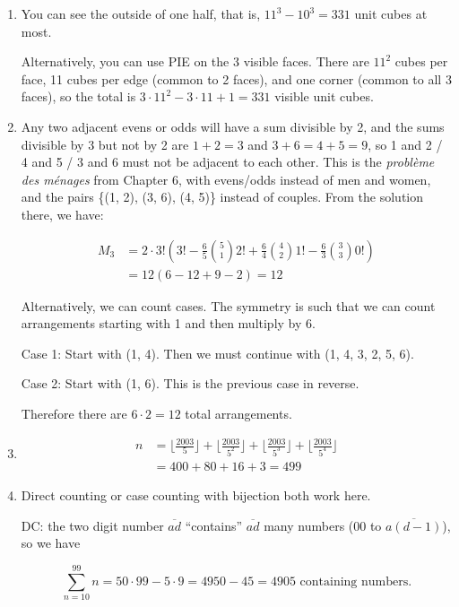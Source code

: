 \documentclass{book}
\numberwithin{equation}{section}
\begin{document}
\begin{enumerate}[label={9.\arabic*}]

\item
You can see the outside of one half, that is, $11^3 - 10^3 = 331$ unit cubes at most.

Alternatively, you can use PIE on the 3 visible faces. There are $11^2$ cubes per face, 11 cubes per edge (common
to 2 faces), and one corner (common to all 3 faces), so the total is $3\cdot11^2-3\cdot11+1 = 331$ visible unit cubes.

\item
Any two adjacent evens or odds will have a sum divisible by 2, and the sums divisible by 3 but not by 2 are
$1+2=3$ and $3+6 = 4+5=9$, so 1 and 2 / 4 and 5 / 3 and 6 must not be adjacent to each other. This is the
\emph{probl\`eme des m\'enages} from Chapter 6, with evens/odds instead of men and women,
and the pairs \{(1, 2), (3, 6), (4, 5)\} instead of couples. From the solution there, we have:

\begin{align*}
M_3 & = 2\cdot3!(3! - \frac{6}{5}{5 \choose 1}2! + \frac{6}{4}{4 \choose 2}1! - \frac{6}{3}{3 \choose 3}0!) \\
& = 12(6-12+9-2) = 12
\end{align*}

Alternatively, we can count cases. The symmetry is such that we can count arrangements starting with 1 and then
multiply by 6.

Case 1: Start with (1, 4). Then we must continue with (1, 4, 3, 2, 5, 6).

Case 2: Start with (1, 6). This is the previous case in reverse.

Therefore there are $6 \cdot 2 = 12$ total arrangements.

\item
\begin{align*}
n & = \lfloor \frac{2003}{5} \rfloor + \lfloor \frac{2003}{5^2} \rfloor + \lfloor \frac{2003}{5^3} \rfloor + \lfloor \frac{2003}{5^4} \rfloor \\
& = 400 + 80 + 16 + 3 = 499
\end{align*}

\item
Direct counting or case counting with bijection both work here.

DC: the two digit number $\overline{ad}$ ``contains'' $\overline{ad}$ many numbers (00 to $\overline{a(d-1)}$), so we have

$$ \sum_{n=10}^99 n = 50\cdot99 - 5\cdot9 = 4950 - 45 = 4905 \text{ containing numbers.}$$


\end{enumerate}
\end{document}
